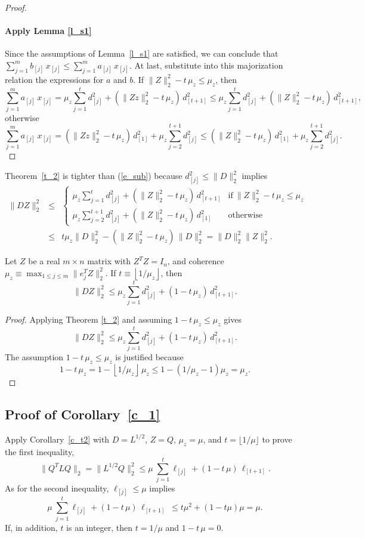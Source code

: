\documentclass{siamltex}
\begin{document}
\begin{proof}
\paragraph{Apply Lemma \ref{l_s1}}
Since the assumptions of Lemma~\ref{l_s1} are satisfied, we can conclude
that
$\sum_{j=1}^{m}{b_{[j]}\,x_{[j]}}\leq \sum_{j=1}^{m}{a_{[j]}\,x_{[j]}}$.
At last, substitute into this majorization 
relation the expressions for $a$ and $b$.
If $\|Z\|_2^2-t\,\mu_z \leq \mu_z$, then
$$\sum_{j=1}^m{a_{[j]}\,x_{[j]}}=\mu_z\sum_{j=1}^t{d_{[j]}^2}+
(\|Zz\|_2^2-t\,\mu_z)\,d_{[t+1]}^2\leq 
\mu_z\sum_{j=1}^t{d_{[j]}^2}+(\|Z\|_2^2-t\,\mu_z)\,d_{[t+1]}^2,$$
otherwise
$$\sum_{j=1}^m{a_{[j]}\,x_{[j]}}=(\|Zz\|_2^2-t\,\mu_z)\,d_{[1]}^2+
\mu_z\sum_{j=2}^{t+1}{d_{[j]}^2}\leq 
(\|Z\|_2^2-t\,\mu_z)\,d_{[1]}^2+
\mu_z\sum_{j=2}^{t+1}{d_{[j]}^2}.$$
\end{proof}

Theorem~\ref{t_2} is tighter than (\ref{e_sub}) because
$d_{[j]}^2\leq \|D\|_2^2$ implies
\begin{eqnarray*}
\|DZ\|_2^2 & \leq &
\begin{cases}
\mu_z\sum_{j=1}^t{d_{[j]}^2}+\left(\|Z\|_2^2-t\,\mu_z\right)\,d_{[t+1]}^2 & 
\text{if}~ \|Z\|_2^2-t\,\mu_z\leq \mu_z \\
\mu_z\sum_{j=2}^{t+1}{d_{[j]}^2}+\left(\|Z\|_2^2-t\,\mu_z\right)\,d_{[1]}^2 &
\text{otherwise}\end{cases}\\
& \leq & t\mu_z \|D\|_2^2 -\left(\|Z\|_2^2-t\,\mu_z\right)\,\|D\|_2^2 =
\|D\|_2^2\|Z\|_2^2.
\end{eqnarray*}

\begin{corollary}\label{c_t2}
Let $Z$ be a real $m\times n$ matrix with $Z^TZ=I_n$, and coherence
$\mu_z\equiv\max_{1\leq j\leq m}{\|e_j^TZ\|_2^2}$. If
$t\equiv\left\lfloor 1/\mu_z\right\rfloor$, then
$$\|DZ\|_2^2\leq \mu_z\sum_{j=1}^t{d_{[j]}^2}+
\left(1-t\,\mu_z\right)\,d_{[t+1]}^2.$$
\end{corollary}
\begin{proof}
Applying Theorem \ref{t_2} and assuming $1-t\,\mu_z\leq \mu_z$ gives
$$\|DZ\|_2^2\leq \mu_z\sum_{j=1}^t{d_{[j]}^2}+
\left(1-t\,\mu_z\right)\,d_{[t+1]}^2.$$
The assumption $1-t\,\mu_z\leq \mu_z$ is justified because
$$1-t\,\mu_z = 1-\left\lfloor 1/\mu_z\right\rfloor\,\mu_z \leq 1-(1/\mu_z - 1)\mu_z = \mu_z.$$
\end{proof}

\subsection{Proof of Corollary~\ref{c_1}}\label{s_lqproof}
Apply Corollary~\ref{c_t2} with $D=L^{1/2}$, $Z=Q$, $\mu_z=\mu$,
and $t=\lfloor 1/\mu\rfloor$ to prove the first inequality,
$$\|Q^TLQ\|_2=\|L^{1/2}Q\|_2^2\leq \mu \>
\sum_{j=1}^t{\ell_{[j]}}+(1-t\,\mu)\,\ell_{[t+1]}.$$ 
As for the second inequality, $\ell_{[j]}\leq \mu$ implies
$$\mu\>\sum_{j=1}^t{\ell_{[j]}}+(1-t\,\mu)\,\ell_{[t+1]}\
\leq t\mu^2+ (1-t\mu)\mu=\mu.$$
If, in addition, $t$ is an integer, then $t=1/\mu$ and $1-t\,\mu=0$.
\end{document}
